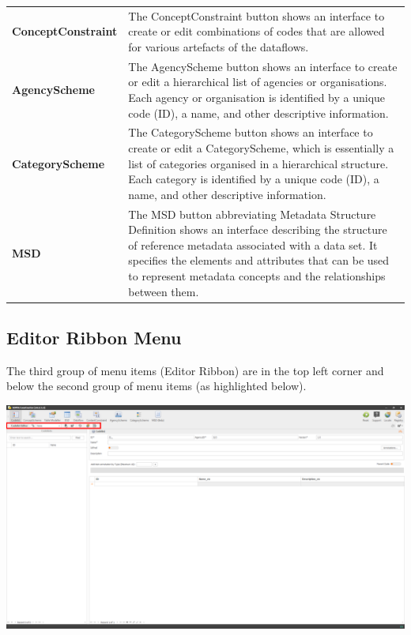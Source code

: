 \documentclass[
]{book}
\begin{document}
\begin{longtable}[]{@{}
  >{\raggedright\arraybackslash}p{}
  >{\raggedright\arraybackslash}p{}@{}}
\textbf{ConceptConstraint} & The ConceptConstraint button shows an interface to create or edit combinations of codes that are allowed for various artefacts of the dataflows. \\
\textbf{AgencyScheme} & The AgencyScheme button shows an interface to create or edit a hierarchical list of agencies or organisations. Each agency or organisation is identified by a unique code (ID), a name, and other descriptive information. \\
\textbf{CategoryScheme} & The CategoryScheme button shows an interface to create or edit a CategoryScheme, which is essentially a list of categories organised in a hierarchical structure. Each category is identified by a unique code (ID), a name, and other descriptive information. \\
\textbf{MSD} & The MSD button abbreviating Metadata Structure Definition shows an interface describing the structure of reference metadata associated with a data set. It specifies the elements and attributes that can be used to represent metadata concepts and the relationships between them. \\
\bottomrule()
\end{longtable}

\hypertarget{editor-ribbon-menu}{%
\subsection{Editor Ribbon Menu}\label{editor-ribbon-menu}}

The third group of menu items (Editor Ribbon) are in the top left corner and below the second group of menu items (as highlighted below).

\begin{center}\includegraphics[width=1\linewidth]{./images/image015} \end{center}
\end{document}

